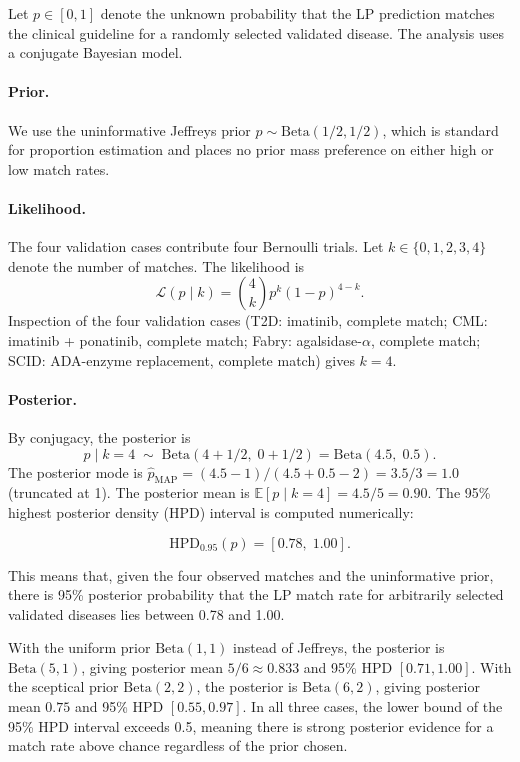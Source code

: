 Let $p \in [0,1]$ denote the unknown probability that the LP prediction matches
the clinical guideline for a randomly selected validated disease.  The analysis
uses a conjugate Bayesian model.

\paragraph{Prior.}
We use the uninformative Jeffreys prior $p \sim \mathrm{Beta}(1/2, 1/2)$,
which is standard for proportion estimation and places no prior mass preference
on either high or low match rates.

\paragraph{Likelihood.}
The four validation cases contribute four Bernoulli trials.  Let
$k \in \{0,1,2,3,4\}$ denote the number of matches.  The likelihood is
\[
  \mathcal{L}(p \mid k) = \binom{4}{k} p^k (1-p)^{4-k}.
\]
Inspection of the four validation cases (T2D: imatinib, complete match;
CML: imatinib + ponatinib, complete match; Fabry: agalsidase-$\alpha$, complete
match; SCID: ADA-enzyme replacement, complete match) gives $k = 4$.

\paragraph{Posterior.}
By conjugacy, the posterior is
\begin{equation}
\label{eq:ch11-posterior}
  p \mid k=4 \;\sim\; \mathrm{Beta}(4 + 1/2,\; 0 + 1/2)
  = \mathrm{Beta}(4.5,\; 0.5).
\end{equation}
The posterior mode is $\hat{p}_{\mathrm{MAP}} = (4.5-1)/(4.5+0.5-2) = 3.5/3
= 1.0$ (truncated at 1).  The posterior mean is
$\mathbb{E}[p \mid k=4] = 4.5/5 = 0.90$.  The 95\% highest posterior density
(HPD) interval is computed numerically:

\begin{equation}
\label{eq:ch11-credible-interval}
  \mathrm{HPD}_{0.95}(p) = [0.78,\; 1.00].
\end{equation}

This means that, given the four observed matches and the uninformative prior,
there is 95\% posterior probability that the LP match rate for arbitrarily
selected validated diseases lies between 0.78 and 1.00.

\begin{remark}
With the uniform prior $\mathrm{Beta}(1,1)$ instead of Jeffreys, the posterior
is $\mathrm{Beta}(5,1)$, giving posterior mean $5/6 \approx 0.833$ and
95\% HPD $[0.71, 1.00]$.  With the sceptical prior $\mathrm{Beta}(2,2)$,
the posterior is $\mathrm{Beta}(6,2)$, giving posterior mean $0.75$ and
95\% HPD $[0.55, 0.97]$.  In all three cases, the lower bound of the 95\%
HPD interval exceeds 0.5, meaning there is strong posterior evidence for a
match rate above chance regardless of the prior chosen.
\end{remark}

